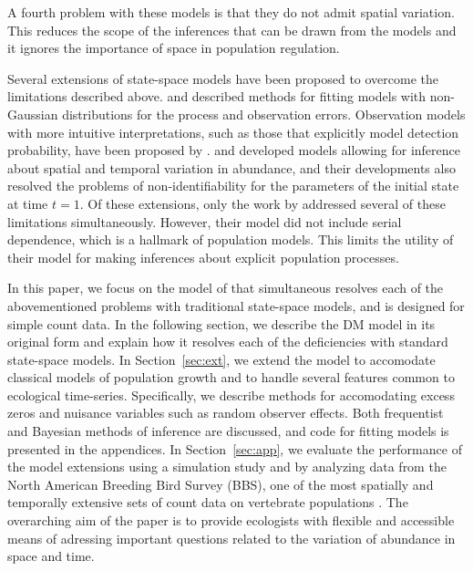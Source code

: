 \documentclass[12pt]{article}
\begin{document}
A fourth problem with these models is that they do not admit
spatial variation. This reduces the scope of the inferences that can
be drawn from the models and it ignores the importance of space in
population regulation.

Several extensions of state-space models have been proposed to
overcome the limitations described
above. \citet{devalpine_hastings:2002} and \citet{kery_etal:2009}
described methods for fitting models with non-Gaussian distributions
for the process and observation errors. Observation models with more
intuitive interpretations, such as those that explicitly model
detection probability, have been proposed by
\citet{kery_etal:2009}. \citet{lele_etal:1998} and
\citet{kery_etal:2009} developed models allowing for inference about
spatial and temporal variation in abundance, and their developments
also resolved the problems of non-identifiability for the parameters
of the initial state at time $t=1$. Of these extensions, only the work by
\citet{kery_etal:2009} addressed several of these limitations
simultaneously. However, their model did not include serial
dependence, which is a hallmark of population models. This limits the
utility of their model for making inferences about explicit population
processes.

In this paper, we focus on the model of
\citet[henceforth the DM model;]{dail_madsen:2011}
that simultaneous resolves each of the abovementioned problems with
traditional state-space models, and is designed for simple count
data.
In the following section, we describe the DM model in its original
form and explain how it resolves each of the deficiencies with
standard state-space models. In Section~\ref{sec:ext}, we extend the
model to accomodate classical models of population growth and to
handle several features common to ecological
time-series. Specifically, we describe methods for accomodating excess
zeros and nuisance variables such as random observer effects. Both
frequentist and Bayesian methods of inference are discussed, and code
for fitting models is presented in the appendices.
In Section~\ref{sec:app}, we evaluate the performance of the model
extensions using a simulation study and by analyzing data from the
North American Breeding Bird Survey (BBS), one of
the most spatially and temporally extensive sets of count data on
vertebrate populations \citep{robbins_etal:1986}. The overarching aim
of  the paper is to provide ecologists with flexible and accessible means of
adressing important questions related to the variation of abundance in
space and time.
\end{document}
